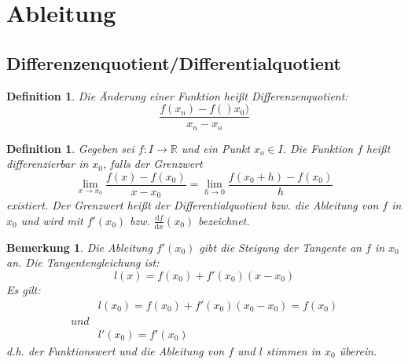 \documentclass[12pt,a4paper]{report}%
\newtheorem{definition}[satz]{Definition}
\newtheorem{bem}{Bemerkung}[section]
\numberwithin{equation}{section}
\newcommand{\R}{\mathbb{R}} %
\def\diff#1#2{\frac{\mathrm{d}#1}{\mathrm{d}#2}}
\numberwithin{equation}{subsection}
\begin{document}
\section{Ableitung}
  \subsection{Differenzenquotient/Differentialquotient}
  \begin{definition}
    Die Änderung einer Funktion heißt Differenzenquotient:
    \begin{equation}
      \frac{f(x_n)-f()x_0)}{x_n - x_o}
    \end{equation}
  \end{definition}
  \begin{definition}
    Gegeben sei $f: I\rightarrow \R$ und ein Punkt $x_o \in I$. Die Funktion $f$ heißt differenzierbar in $x_0$, falls der Grenzwert
    \begin{equation}
      \lim_{x\rightarrow x_0} \frac{f(x) - f(x_0)}{x - x_0} = \lim_{h \rightarrow 0} \frac{f(x_0 + h) - f(x_0)}{h}
    \end{equation}
    existiert. Der Grenzwert heißt der Differentialquotient bzw. die Ableitung von $f$ in $x_0$ und wird mit $f'(x_0)$ bzw. $\diff{f}{x}(x_0)$ bezeichnet.
  \end{definition}
  \begin{bem}
    Die Ableitung $f'(x_0)$ gibt die Steigung der Tangente an $f$ in $x_0$ an. Die Tangentengleichung ist:
    \begin{equation}
      l(x) = f(x_0) + f'(x_0)(x-x_0)
    \end{equation}
    Es gilt:
    \begin{align}
      &l(x_0) = f(x_0) + f'(x_0)(x_0 - x_0) = f(x_0) \\
      und\nonumber \\
      &l'(x_0) = f'(x_0)
    \end{align}
    d.h. der Funktionswert und die Ableitung von $f$ und $l$ stimmen in $x_0$ überein.
  \end{bem}
\end{document}
